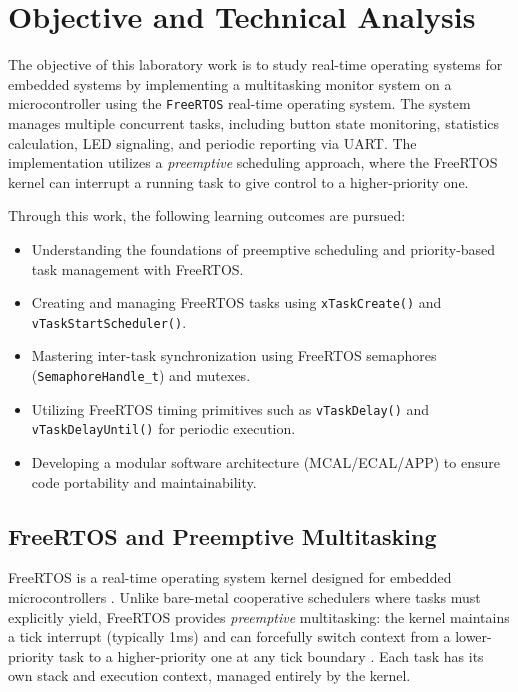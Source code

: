 \newpage

\tableofcontents

\newpage

\section{Objective and Technical Analysis}

The objective of this laboratory work is to study real-time operating systems for embedded systems by implementing a multitasking monitor system on a microcontroller using the \texttt{FreeRTOS} real-time operating system. The system manages multiple concurrent tasks, including button state monitoring, statistics calculation, LED signaling, and periodic reporting via UART. The implementation utilizes a \textit{preemptive} scheduling approach, where the FreeRTOS kernel can interrupt a running task to give control to a higher-priority one.

Through this work, the following learning outcomes are pursued:
\begin{itemize}
    \item Understanding the foundations of preemptive scheduling and priority-based task management with FreeRTOS.
    \item Creating and managing FreeRTOS tasks using \texttt{xTaskCreate()} and \texttt{vTaskStartScheduler()}.
    \item Mastering inter-task synchronization using FreeRTOS semaphores (\texttt{SemaphoreHandle\_t}) and mutexes.
    \item Utilizing FreeRTOS timing primitives such as \texttt{vTaskDelay()} and \texttt{vTaskDelayUntil()} for periodic execution.
    \item Developing a modular software architecture (MCAL/ECAL/APP) to ensure code portability and maintainability.
\end{itemize}

\subsection{FreeRTOS and Preemptive Multitasking}

FreeRTOS is a real-time operating system kernel designed for embedded microcontrollers \cite{freertos_book}. Unlike bare-metal cooperative schedulers where tasks must explicitly yield, FreeRTOS provides \textit{preemptive} multitasking: the kernel maintains a tick interrupt (typically 1ms) and can forcefully switch context from a lower-priority task to a higher-priority one at any tick boundary \cite{freertos_docs}. Each task has its own stack and execution context, managed entirely by the kernel.

